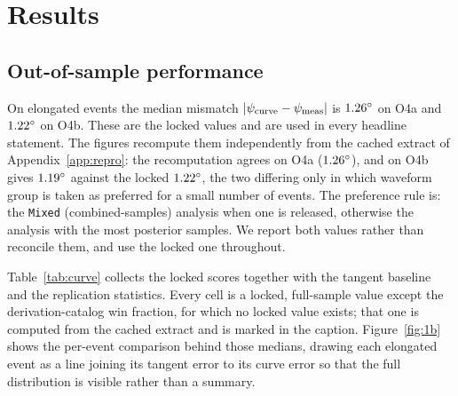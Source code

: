 \documentclass[aps,preprint,amsmath,amssymb,nofootinbib,superscriptaddress]{revtex4-2}
\begin{document}
\section{Results}
\label{sec:results}

\subsection{Out-of-sample performance}
\label{sec:oos}
On elongated events the median mismatch $|\psi_{\rm curve}-\psi_{\rm meas}|$ is
$1.26^\circ$ on O4a and $1.22^\circ$ on O4b. These are the locked values
and are used in every headline statement. The figures recompute them independently from the cached
extract of Appendix~\ref{app:repro}: the recomputation agrees on O4a ($1.26^\circ$), and on O4b
gives $1.19^\circ$ against the locked $1.22^\circ$, the two differing only in
which waveform group is taken as preferred for a small number of events. The preference rule is: the
\texttt{Mixed} (combined-samples) analysis when one is released, otherwise the analysis with the most
posterior samples. We report both values rather than reconcile them, and use the locked one throughout.

Table~\ref{tab:curve} collects the locked scores together with the tangent baseline and the replication
statistics. Every cell is a locked, full-sample value except the derivation-catalog win fraction, for
which no locked value exists; that one is computed from the cached extract and is marked in the caption.
Figure~\ref{fig:1b} shows the per-event comparison behind those medians, drawing each elongated event as a line joining its
tangent error to its curve error so that the full distribution is visible rather than a summary.
\end{document}
